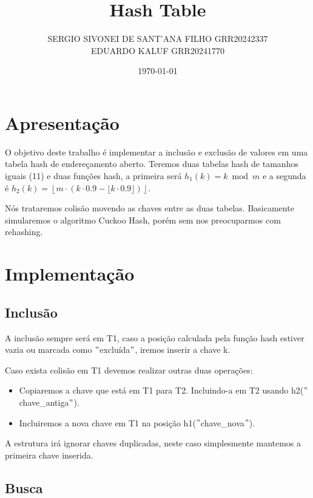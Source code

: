 \documentclass{article}
\title{Hash Table}
\author{SERGIO SIVONEI DE SANT'ANA FILHO GRR20242337\\EDUARDO KALUF GRR20241770}
\date{\today}
\begin{document}
    \maketitle
    
    \section{Apresentação}\label{sec:apresentacao}

        \setlength{\parindent}{15pt}

        O objetivo deste trabalho é implementar a inclusão e exclusão de valores em uma tabela hash de endereçamento aberto.
        Teremos duas tabelas hash de tamanhos iguais (11) e duas funções hash, a primeira será $h_1(k) = k \bmod m$ e a segunda é $h_2(k) = \left\lfloor m \cdot (k \cdot 0.9 - \lfloor k \cdot 0.9 \rfloor) \right\rfloor$.

        Nós trataremos colisão movendo as chaves entre as duas tabelas.
        Basicamente simularemos o algoritmo Cuckoo Hash, porém sem nos preocuparmos com rehashing.

    \section{Implementação}\label{sec:implementacao}

        \subsection{Inclusão}\label{subsec:inclusao}

            A inclusão sempre será em T1, caso a posição calculada pela função hash estiver vazia ou marcada como \("\)excluída\("\), iremos inserir a chave k.

            Caso exista colisão em T1 devemos realizar outras duas operações:

            \begin{itemize}
                \item Copiaremos a chave que está em T1 para T2. Incluindo-a em T2 usando h2(\("\)chave\_antiga\("\)).
                \item Incluiremos a nova chave em T1 na posição h1(\("\)chave\_nova\("\)).
            \end{itemize}

            A estrutura irá ignorar chaves duplicadas, neste caso simplesmente mantemos a primeira chave inserida.

        \subsection{Busca}\label{subsec:busca}
\end{document}
